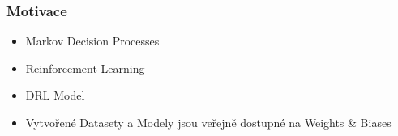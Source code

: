 




\begin{frame}
    \frametitle{Motivace}
    \begin{itemize}
        \itemsep1em
        \item Markov Decision Processes
        \item Reinforcement Learning
        \item DRL Model
        \item Vytvořené Datasety a Modely jsou veřejně dostupné na Weights \& Biases
    \end{itemize}
\end{frame}

